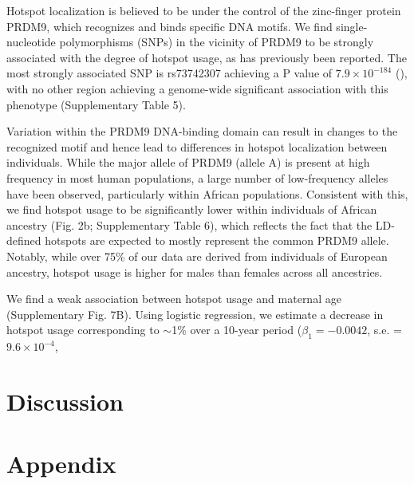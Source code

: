 Hotspot localization is believed to be under the control of the
zinc-finger protein PRDM9, which recognizes and binds specific
DNA motifs\cite{Berg2010,Berg2011,Hinch2011,Parvanov2010}. We find single-nucleotide polymorphisms
(SNPs) in the vicinity of PRDM9 to be strongly associated with
the degree of hotspot usage, as has previously been reported\cite{Kong2014,Hinch2011}.
The most strongly associated SNP is rs73742307 achieving a
P value of $7.9 \times 10^{-184}$ (\citet{Reynolds2013}), with no other region achieving a
genome-wide significant association with this phenotype
(Supplementary Table 5).

Variation within the PRDM9 DNA-binding domain can result
in changes to the recognized motif and hence lead to differences
in hotspot localization between individuals. While the major allele
of PRDM9 (allele A) is present at high frequency in most human
populations, a large number of low-frequency alleles have been
observed, particularly within African populations\cite{Berg2011,Parvanov2010}. Consistent
with this, we find hotspot usage to be significantly lower within
individuals of African ancestry (Fig. 2b; Supplementary Table 6),
which reflects the fact that the LD-defined hotspots are expected
to mostly represent the common PRDM9 allele. Notably, while
over 75\% of our data are derived from individuals of European
ancestry, hotspot usage is higher for males than females across all
ancestries.

We find a weak association between hotspot usage and
maternal age (Supplementary Fig. 7B). Using logistic regression,
we estimate a decrease in hotspot usage corresponding to
$\sim$1\% over a 10-year period ($\beta_1 = -0.0042$, s.e. = $9.6 \times 10^{-4}$, 




\section{Discussion}




\section{Appendix}
